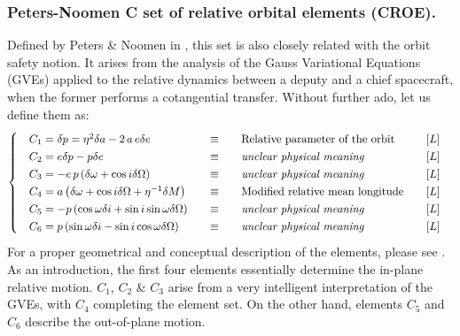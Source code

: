 	\subsubsection{Peters-Noomen C set of relative orbital elements (CROE).}\label{sec:C_ROE}
	\indent Defined by Peters \& Noomen in \cite{Peters_Noomen}, this set is also closely related with the orbit safety notion. It arises from the analysis of the Gauss Variational Equations (GVEs) applied to the relative dynamics between a deputy and a chief spacecraft, when the former performs a cotangential transfer. Without further ado, let us define them as:
	\begin{equation}
	\arraycolsep=10pt
	\def\arraystretch{1.3}
	\left\{\begin{array}{llll}
	C_1 = \delta p = \eta^2 \delta a - 2\, a \, e \delta e  & \equiv & \text{Relative parameter of the orbit} &  [L] \\
	C_2 = e\delta p - p \delta e & \equiv  & \text{\textit{unclear physical meaning}}  &  [L] \\
	C_3 = -e\, p \left(\delta \omega + \cos i \delta \Omega\right)& \equiv  & \text{\textit{unclear physical meaning}} &  [L] \\
	C_4 = a \left( \delta\omega + \cos i \delta \Omega + \eta^{-1} \delta M\right)& \equiv  & \text{Modified relative mean longitude}  & [L]  \\
	C_5 = -p\left( \cos\omega \delta i + \sin i \sin\omega \delta \Omega \right)&  \equiv  & \text{\textit{unclear physical meaning}} &  [L] \\
	C_6 = p\left( \sin\omega \delta i - \sin i \cos \omega \delta \Omega \right)&  \equiv  & \text{\textit{unclear physical meaning}} &  [L] \\
	\end{array}\right.
	\end{equation}
	\indent For a proper geometrical and conceptual description of the elements, please see \cite{Peters_Noomen}. As an introduction, the first four elements essentially determine the in-plane relative motion. $C_1$, $C_2$ \& $C_3$ arise from a very intelligent interpretation of the GVEs, with $C_4$ completing the element set. On the other hand, elements $C_5$ and $C_6$ describe the out-of-plane motion.
	
%
